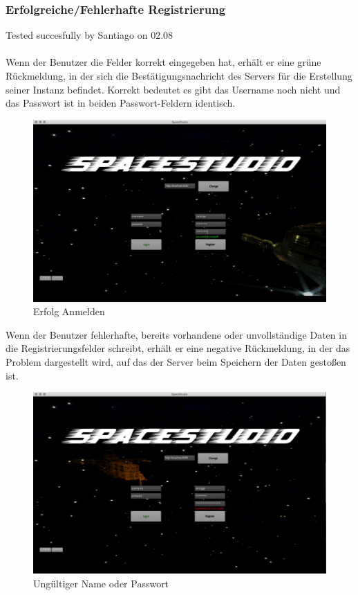 \documentclass[12pt]{article}
\begin{document}
\subsubsection{Erfolgreiche/Fehlerhafte  Registrierung}
Tested succesfully by Santiago on 02.08\\\\
Wenn der Benutzer die Felder korrekt eingegeben hat, erhält er eine grüne Rückmeldung, in der sich die Bestätigungsnachricht des Servers für die Erstellung seiner Instanz befindet. Korrekt bedeutet es gibt das Username noch nicht und das Passwort ist in beiden Passwort-Feldern identisch.\\
\begin{figure}[h]
\centering
\includegraphics[scale=0.4]{TestProtocolBilder/erfolgAnmelden.jpg}
\caption{Erfolg Anmelden}
\end{figure}

Wenn der Benutzer fehlerhafte, bereits vorhandene oder unvollständige Daten in die Registrierungsfelder schreibt, erhält er eine negative Rückmeldung, in der das Problem dargestellt wird, auf das der Server beim Speichern der Daten gestoßen ist.\\
\begin{figure}[h]
\centering
\includegraphics[scale=0.4]{TestProtocolBilder/doesnotMatchPassword.jpg}
\caption{Ungültiger Name oder Passwort}
\end{figure}
\newpage
\end{document}
